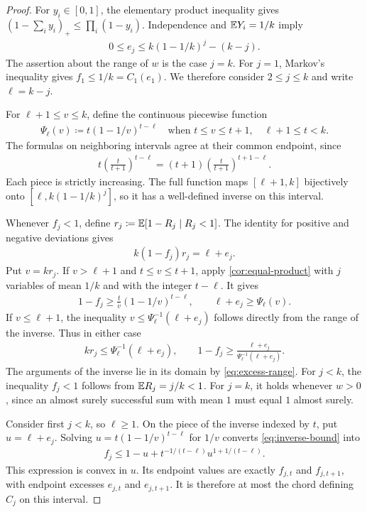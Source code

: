 \begin{proof}
For $y_i\in[0,1]$, the elementary product inequality gives $(1-\sum_i y_i)_+\le\prod_i(1-y_i)$. Independence and $\mathbb E Y_i=1/k$ imply
\begin{align}\label{eq:excess-range}
 0\le e_j\le k(1-1/k)^j-(k-j).
\end{align}
The assertion about the range of $w$ is the case $j=k$. For $j=1$, Markov's inequality gives $f_1\le1/k=C_1(e_1)$. We therefore consider $2\le j\le k$ and write $\ell=k-j$.

For $\ell+1\le v\le k$, define the continuous piecewise function
\begin{align*}
 \Psi_\ell(v)\coloneqq t(1-1/v)^{t-\ell}
 \quad\text{when }t\le v\le t+1,
 \quad \ell+1\le t<k.
\end{align*}
The formulas on neighboring intervals agree at their common endpoint, since
\begin{align*}
 t\left(\frac{t}{t+1}\right)^{t-\ell}
 =(t+1)\left(\frac{t}{t+1}\right)^{t+1-\ell}.
\end{align*}
Each piece is strictly increasing. The full function maps $[\ell+1,k]$ bijectively onto $[\ell,k(1-1/k)^j]$, so it has a well-defined inverse on this interval.

Whenever $f_j<1$, define $r_j\coloneqq\mathbb E[1-R_j\mid R_j<1]$. The identity for positive and negative deviations gives
\begin{align*}
 k(1-f_j)r_j=\ell+e_j.
\end{align*}
Put $v=kr_j$. If $v>\ell+1$ and $t\le v\le t+1$, apply \cref{cor:equal-product} with $j$ variables of mean $1/k$ and with the integer $t-\ell$. It gives
\begin{align*}
 1-f_j\ge\frac{t}{v}(1-1/v)^{t-\ell},
 \qquad \ell+e_j\ge\Psi_\ell(v).
\end{align*}
If $v\le\ell+1$, the inequality $v\le\Psi_\ell^{-1}(\ell+e_j)$ follows directly from the range of the inverse. Thus in either case
\begin{align}\label{eq:inverse-bound}
 kr_j\le\Psi_\ell^{-1}(\ell+e_j),
 \qquad 1-f_j\ge\frac{\ell+e_j}{\Psi_\ell^{-1}(\ell+e_j)}.
\end{align}
The arguments of the inverse lie in its domain by \cref{eq:excess-range}. For $j<k$, the inequality $f_j<1$ follows from $\mathbb E R_j=j/k<1$. For $j=k$, it holds whenever $w>0$, since an almost surely successful sum with mean $1$ must equal $1$ almost surely.

Consider first $j<k$, so $\ell\ge1$. On the piece of the inverse indexed by $t$, put $u=\ell+e_j$. Solving $u=t(1-1/v)^{t-\ell}$ for $1/v$ converts \cref{eq:inverse-bound} into
\begin{align*}
 f_j\le 1-u+t^{-1/(t-\ell)}u^{1+1/(t-\ell)}.
\end{align*}
This expression is convex in $u$. Its endpoint values are exactly $f_{j,t}$ and $f_{j,t+1}$, with endpoint excesses $e_{j,t}$ and $e_{j,t+1}$. It is therefore at most the chord defining $C_j$ on this interval.


\end{proof}

